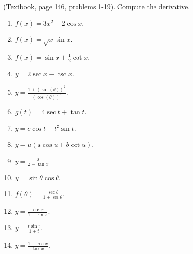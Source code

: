 
(Textbook, page 146, problems 1-19).
Compute the derivative.
\begin{multicols}{2}
\begin{enumerate}
\item $f(x)= 3x^2 -2 \cos x$.

\item $f(x)=\sqrt{x}\sin x$.

\item $f(x)=\sin x +\frac{1}{2}\cot x$.

\item $y=2\sec x - \csc x$.

\item $y=\frac{1+(\sin{}(\theta))^{2}}{(\cos{}(\theta))^{3}}$.

\item $g(t)=4 \sec t + \tan t$.

\item $y= c\cos t + t^2\sin t$.

\item $y=u(a\cos u + b \cot u)$.

\item $y=\frac{x}{2-\tan x}$.

\item $y=\sin \theta \cos \theta$.

\item $f(\theta)=\frac{\sec \theta}{1+\sec \theta}$.

\item $y=\frac{\cos x}{1-\sin x}$.

\item $y=\frac{t\sin t}{1+t}$.

\item $y=\frac{1-\sec x}{\tan x}$.


\end{enumerate}
\end{multicols}
